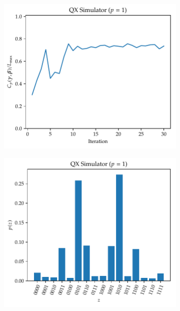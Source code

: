 \begin{figure}[ht]
    \centering
    \begin{subfigure}{.49\textwidth}
        \centering
        \includegraphics[width=1\linewidth]{figures/qaoa_maxcut_n4_p1_qx_optimization.pdf}
    \end{subfigure}
    \hfill
    \begin{subfigure}{.49\textwidth}
        \centering
        \includegraphics[width=1\linewidth]{figures/qaoa_maxcut_n4_p1_qx_probs.pdf}
    \end{subfigure}


\end{figure}
